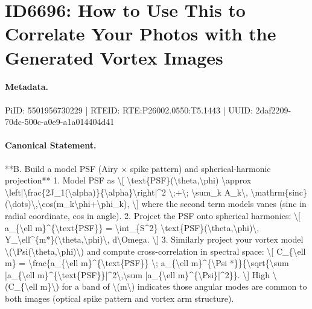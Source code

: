 \section*{ID6696: How to Use This to Correlate Your Photos with the Generated Vortex Images}
\paragraph{Metadata.}
PiID: 5501956730229 | RTEID: RTE:P26002.0550:T5.1443 | UUID: 2daf2209-70dc-500c-a0e9-a1a014404d41

\paragraph{Canonical Statement.}
**B. Build a model PSF (Airy × spike pattern) and spherical-harmonic projection** 1. Model PSF as \textbackslash{}[ \textbackslash{}text\{PSF\}(\textbackslash{}theta,\textbackslash{}phi) \textbackslash{}approx \textbackslash{}left|\textbackslash{}frac\{2J\_1(\textbackslash{}alpha)\}\{\textbackslash{}alpha\}\textbackslash{}right|\textasciicircum{}2 \textbackslash{};+\textbackslash{}; \textbackslash{}sum\_k A\_k\textbackslash{}, \textbackslash{}mathrm\{sinc\}(\textbackslash{}dots)\textbackslash{},\textbackslash{}cos(m\_k\textbackslash{}phi+\textbackslash{}phi\_k), \textbackslash{}] where the second term models vanes (sinc in radial coordinate, cos in angle). 2. Project the PSF onto spherical harmonics: \textbackslash{}[ a\_\{\textbackslash{}ell m\}\textasciicircum{}\{\textbackslash{}text\{PSF\}\} = \textbackslash{}int\_\{S\textasciicircum{}2\} \textbackslash{}text\{PSF\}(\textbackslash{}theta,\textbackslash{}phi)\textbackslash{}, Y\_\textbackslash{}ell\textasciicircum{}\{m*\}(\textbackslash{}theta,\textbackslash{}phi)\textbackslash{}, d\textbackslash{}Omega. \textbackslash{}] 3. Similarly project your vortex model \textbackslash{}(\textbackslash{}Psi(\textbackslash{}theta,\textbackslash{}phi)\textbackslash{}) and compute cross-correlation in spectral space: \textbackslash{}[ C\_\{\textbackslash{}ell m\} = \textbackslash{}frac\{a\_\{\textbackslash{}ell m\}\textasciicircum{}\{\textbackslash{}text\{PSF\}\} \textbackslash{}; a\_\{\textbackslash{}ell m\}\textasciicircum{}\{\textbackslash{}Psi *\}\}\{\textbackslash{}sqrt\{\textbackslash{}sum |a\_\{\textbackslash{}ell m\}\textasciicircum{}\{\textbackslash{}text\{PSF\}\}|\textasciicircum{}2\textbackslash{},\textbackslash{}sum |a\_\{\textbackslash{}ell m\}\textasciicircum{}\{\textbackslash{}Psi\}|\textasciicircum{}2\}\}. \textbackslash{}] High \textbackslash{}(C\_\{\textbackslash{}ell m\}\textbackslash{}) for a band of \textbackslash{}(m\textbackslash{}) indicates those angular modes are common to both images (optical spike pattern and vortex arm structure).

